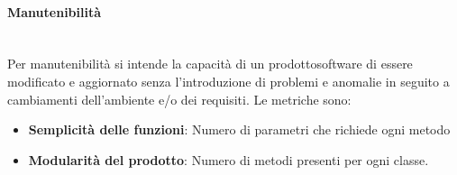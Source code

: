 	\paragraph{Manutenibilità} \mbox{}\\
	Per manutenibilità si intende la capacità di un prodotto\glosp software di essere modificato e aggiornato senza l'introduzione di problemi e anomalie in seguito a cambiamenti dell'ambiente e/o dei requisiti.
	Le metriche sono:\\
	\begin{itemize}
		\item \textbf{Semplicità delle funzioni}: Numero di parametri che richiede ogni metodo
		\item \textbf{Modularità del prodotto}: Numero di metodi presenti per ogni classe.
	\end{itemize}
